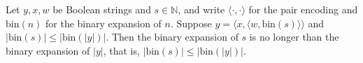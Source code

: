 \begin{lemma}
\label{Complexity.Codec.Shape1.width}
\leanok
{}
Let $y,x,w$ be Boolean strings and $s\in\mathbb{N}$, and write
$\langle\cdot,\cdot\rangle$ for the pair encoding and $\mathrm{bin}(n)$ for the binary
expansion of $n$. Suppose $y=\langle x,\langle w,\mathrm{bin}(s)\rangle\rangle$ and
$|\mathrm{bin}(s)|\le|\mathrm{bin}(|y|)|$. Then the binary expansion of $s$ is no longer
than the binary expansion of $|y|$, that is, $|\mathrm{bin}(s)|\le|\mathrm{bin}(|y|)|$.
\end{lemma}
